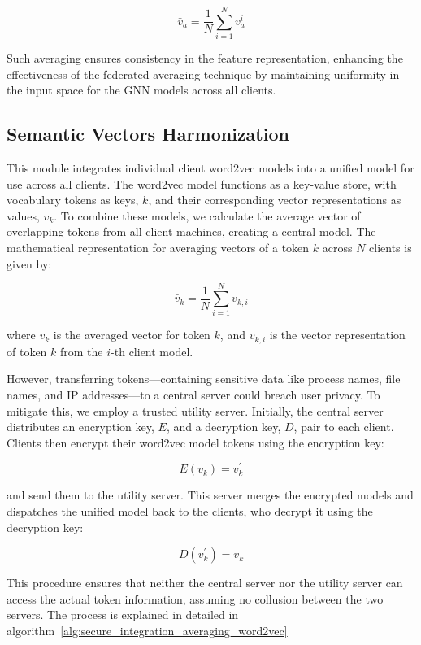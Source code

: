 \[
\bar{v}_a = \frac{1}{N} \sum_{i=1}^{N} v_a^i
\]

Such averaging ensures consistency in the feature representation, enhancing the effectiveness of the federated averaging technique by maintaining uniformity in the input space for the GNN models across all clients.


\subsection{Semantic Vectors Harmonization}
This module integrates individual client word2vec models into a unified model for use across all clients. The word2vec model functions as a key-value store, with vocabulary tokens as keys, \(k\), and their corresponding vector representations as values, \(v_k\). To combine these models, we calculate the average vector of overlapping tokens from all client machines, creating a central model. The mathematical representation for averaging vectors of a token \(k\) across \(N\) clients is given by:

\[
\bar{v}_k = \frac{1}{N} \sum_{i=1}^{N} v_{k,i}
\]

where \(\bar{v}_k\) is the averaged vector for token \(k\), and \(v_{k,i}\) is the vector representation of token \(k\) from the \(i\)-th client model.

However, transferring tokens—containing sensitive data like process names, file names, and IP addresses—to a central server could breach user privacy. To mitigate this, we employ a trusted utility server. Initially, the central server distributes an encryption key, \(E\), and a decryption key, \(D\), pair to each client. Clients then encrypt their word2vec model tokens using the encryption key:

\[
E(v_{k}) = v_{k}^{'}
\]

and send them to the utility server. This server merges the encrypted models and dispatches the unified model back to the clients, who decrypt it using the decryption key:

\[
D(v_{k}^{'}) = v_{k}
\]

This procedure ensures that neither the central server nor the utility server can access the actual token information, assuming no collusion between the two servers. The process is explained in detailed in algorithm~\ref{alg:secure_integration_averaging_word2vec}

